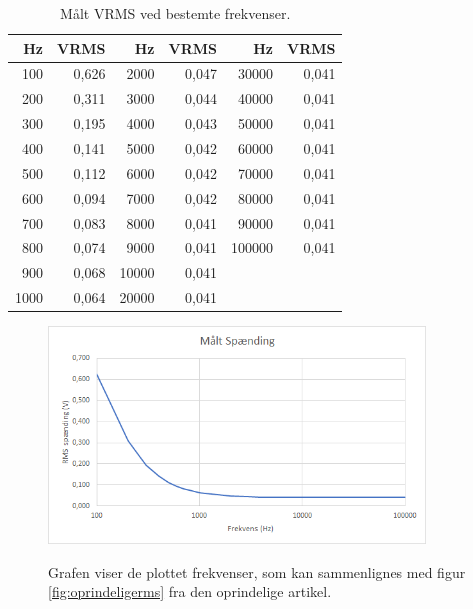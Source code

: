 \begin{table}[H]
\centering
\begin{tabular}{| r | r || r | r || r | r |}
    \hline
    \textbf{Hz} & \textbf{VRMS} & \textbf{Hz} & \textbf{VRMS} & \textbf{Hz} & \textbf{VRMS}\\ \hline
    100 & 0,626 & 2000 & 0,047 & 30000 & 0,041 \\ \hline
    200 & 0,311 & 3000 & 0,044 & 40000 & 0,041   \\ \hline
    300 & 0,195 & 4000 & 0,043 & 50000 & 0,041   \\ \hline
    400 & 0,141 & 5000 & 0,042 & 60000 & 0,041   \\ \hline
    500 & 0,112 & 6000 & 0,042 & 70000 & 0,041  \\ \hline
    600 & 0,094 & 7000 & 0,042 & 80000 & 0,041   \\ \hline
    700 & 0,083 & 8000 & 0,041 & 90000 & 0,041  \\ \hline
    800 & 0,074 & 9000 & 0,041 & 100000 & 0,041   \\ \hline
    900 & 0,068 & 10000 & 0,041 &  &     \\ \hline
    1000 & 0,064 & 20000 & 0,041 & &   \\ \hline
\end{tabular}
    \caption{Målt VRMS ved bestemte frekvenser.}
    \label{table:frekvenservrms}
\end{table} 


\begin{figure}[H]
\centering
{\includegraphics[width=10cm]
{Figure/testopstilling1multisimVRMSgraf}}
\caption{Grafen viser de plottet frekvenser, som kan sammenlignes med figur \ref{fig:oprindeligerms} fra den oprindelige artikel.}
\label{fig:testopstilling1multisimVRMSgraf}
\end{figure}








